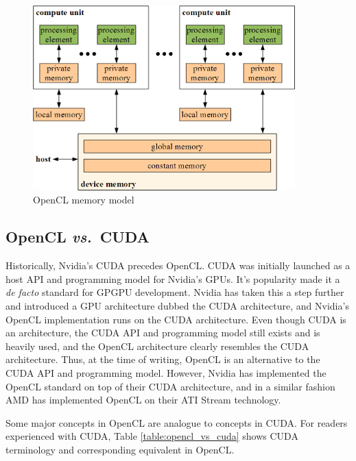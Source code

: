		\begin{figure}[h]
		\centering
		\includegraphics[width=0.9\textwidth]{graphics/memory_model.png}
		\caption{OpenCL memory model}
		\label{fig:opencl_memory}
		\end{figure}
		
\subsection{OpenCL \textit{vs.}\ CUDA}

	Historically, Nvidia's CUDA precedes OpenCL. CUDA was initially launched as a host API and programming model for Nvidia's GPUs. It's popularity made it a \emph{de facto} standard for GPGPU development. Nvidia has taken this a step further and introduced a GPU architecture dubbed the CUDA architecture, and Nvidia's OpenCL implementation runs on the CUDA architecture. Even though CUDA is an architecture, the CUDA API and programming model still exists and is heavily used, and the OpenCL architecture clearly resembles the CUDA architecture. Thus, at the time of writing, OpenCL is an alternative to the CUDA API and programming model. However, Nvidia has implemented the OpenCL standard on top of their CUDA architecture, and in a similar fashion AMD has implemented OpenCL on their ATI Stream technology.
	
	Some major concepts in OpenCL are analogue to concepts in CUDA. For readers experienced with CUDA, Table \ref{table:opencl_vs_cuda} shows CUDA terminology and corresponding equivalent in OpenCL.
	
